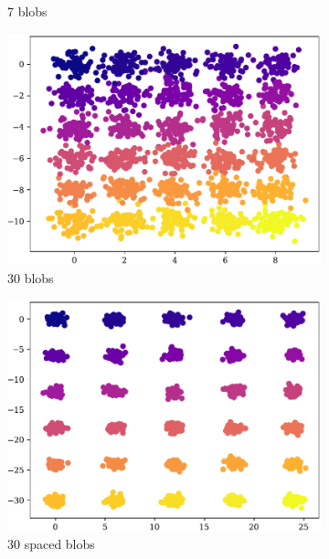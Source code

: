 \begin{figure}[hbtp]
\begin{subfigure}[b]{0.45\columnwidth}
        \caption{7 blobs}
        \label{subfig:7-3-truth}
    \end{subfigure}
    \begin{subfigure}[b]{0.45\columnwidth}
        \includegraphics[width=\columnwidth]{../plots/truth_30-30.pdf}
        \caption{30 blobs}
        \label{subfig:30-30-truth}
    \end{subfigure}
    \hspace{0.04\columnwidth}
    \begin{subfigure}[b]{0.45\columnwidth}
        \includegraphics[width=\columnwidth]{../plots/truth_30-30-6.pdf}
        \caption{30 spaced blobs}
        \label{subfig:30-30-6-truth}
    \end{subfigure}
    \begin{subfigure}[b]{0.45\columnwidth}

\end{subfigure}
\end{figure}
